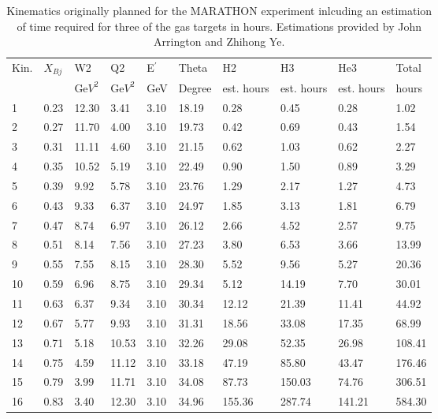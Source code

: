 \begin{table}[]
	\begin{tabular}{|l|l|l|l|l|l|l|l|l|l|}
		\hline
		Kin. & $X_{Bj}$& W2    & Q2    & E$^\prime$    & Theta & H2   & H3   & He3   & Total  \\ 
        &&Ge$V^2$&Ge$V^2$& GeV & Degree& est. hours&est. hours&est. hours& hours  \\ \hline
		1    & 0.23 & 12.30 & 3.41  & 3.10 & 18.19 & 0.28 & 0.45 & 0.28  & 1.02   \\ \hline
		2    & 0.27 & 11.70 & 4.00  & 3.10 & 19.73 & 0.42 & 0.69 & 0.43  & 1.54   \\ \hline
		3    & 0.31 & 11.11 & 4.60  & 3.10 & 21.15 & 0.62 & 1.03 & 0.62  & 2.27   \\ \hline
		4    & 0.35 & 10.52 & 5.19  & 3.10 & 22.49 & 0.90 & 1.50 & 0.89  & 3.29   \\ \hline
		5    & 0.39 & 9.92  & 5.78  & 3.10 & 23.76 & 1.29 & 2.17 & 1.27  & 4.73   \\ \hline
		6    & 0.43 & 9.33  & 6.37  & 3.10 & 24.97 & 1.85 & 3.13 & 1.81  & 6.79   \\ \hline
		7    & 0.47 & 8.74  & 6.97  & 3.10 & 26.12 & 2.66 & 4.52 & 2.57  & 9.75   \\ \hline
		8    & 0.51 & 8.14  & 7.56  & 3.10 & 27.23 & 3.80 & 6.53 & 3.66  & 13.99  \\ \hline
		9    & 0.55 & 7.55  & 8.15  & 3.10 & 28.30 & 5.52 & 9.56 & 5.27  & 20.36  \\ \hline
		10   & 0.59 & 6.96  & 8.75  & 3.10 & 29.34 & 5.12 & 14.19& 7.70  & 30.01  \\ \hline
		11   & 0.63 & 6.37  & 9.34  & 3.10 & 30.34 & 12.12& 21.39& 11.41 & 44.92  \\ \hline
		12   & 0.67 & 5.77  & 9.93  & 3.10 & 31.31 & 18.56& 33.08& 17.35 & 68.99  \\ \hline
		13   & 0.71 & 5.18  & 10.53 & 3.10 & 32.26 & 29.08& 52.35& 26.98 & 108.41 \\ \hline
		14   & 0.75 & 4.59  & 11.12 & 3.10 & 33.18 & 47.19& 85.80& 43.47 & 176.46 \\ \hline
		15   & 0.79 & 3.99  & 11.71 & 3.10 & 34.08 & 87.73&150.03& 74.76 & 306.51 \\ \hline
		16   & 0.83 & 3.40  & 12.30 & 3.10 & 34.96 &155.36&287.74&141.21 & 584.30 \\ \hline
	\end{tabular}
	\caption{Kinematics originally planned for the MARATHON experiment inlcuding an estimation of time required for three of the gas targets in hours. Estimations provided by John Arrington and Zhihong Ye\cite{RateEst}. }
	\label{OldKT}
\end{table}

